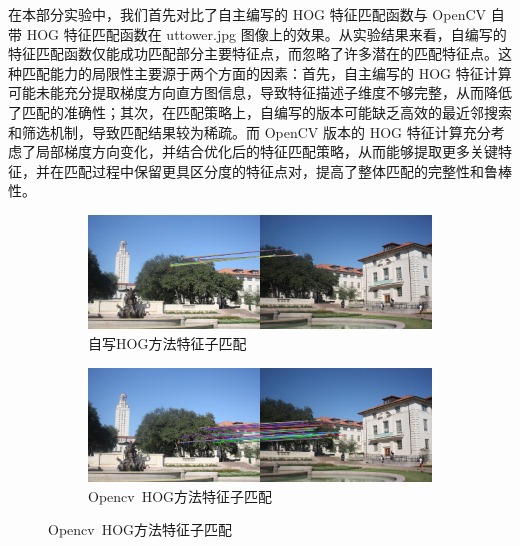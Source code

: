 \documentclass[a4paper, utf8]{ctexart}
\begin{document}
	在本部分实验中，我们首先对比了自主编写的 HOG 特征匹配函数与 OpenCV 自带 HOG 特征匹配函数在 uttower.jpg 图像上的效果。从实验结果来看，自编写的特征匹配函数仅能成功匹配部分主要特征点，而忽略了许多潜在的匹配特征点。这种匹配能力的局限性主要源于两个方面的因素：首先，自主编写的 HOG 特征计算可能未能充分提取梯度方向直方图信息，导致特征描述子维度不够完整，从而降低了匹配的准确性；其次，在匹配策略上，自编写的版本可能缺乏高效的最近邻搜索和筛选机制，导致匹配结果较为稀疏。而 OpenCV 版本的 HOG 特征计算充分考虑了局部梯度方向变化，并结合优化后的特征匹配策略，从而能够提取更多关键特征，并在匹配过程中保留更具区分度的特征点对，提高了整体匹配的完整性和鲁棒性。
	
	\begin{figure}[htbp]
		\centering
		\begin{subfigure}{.8\textwidth}
			\centering
			\includegraphics[height=.15\textheight]{./figure/uttower_handon_match_hog.png}
			\caption{自写HOG方法特征子匹配}
		\end{subfigure}
		\begin{subfigure}{.8\textwidth}
			\centering
			\includegraphics[height=.15\textheight]{./figure/uttower_opencv_match_hog.png}
			\caption{Opencv\ HOG方法特征子匹配}
		\end{subfigure}
		

\end{figure}
\end{document}
